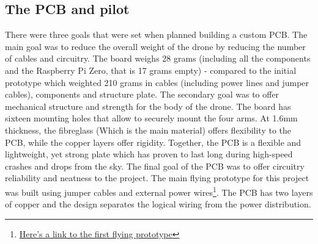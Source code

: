 \documentclass{IEEEtran}
\begin{document}
\subsection{\large{The PCB and pilot}}
\noindent There were three goals that were set when planned building a custom PCB. The main goal was to reduce the overall weight of the drone by reducing the number of cables and circuitry. The board weighs 28 grams (including all the components and the Raspberry Pi Zero, that is 17 grams empty) - compared to the initial prototype which weighted 210 grams in cables (including power lines and jumper cables), components and structure plate.
\newline
\newline
The secondary goal was to offer mechanical structure and strength for the body of the drone. The board has sixteen mounting holes that allow to securely mount the four arms. At 1.6mm thickness, the fibreglass (Which is the main material) offers flexibility to the PCB, while the copper layers offer rigidity. Together, the PCB is a flexible and lightweight, yet strong plate which has proven to last long during high-speed crashes and drops from the sky. 
\newline
\newline
The final goal of the PCB was to offer circuitry reliability and neatness to the project. The main flying prototype for this project was built using jumper cables and external power wires\footnote{\hyperlink{https://www.youtube.com/watch?v=LCkdW5JWxsk&feature=youtu.be}{Here's a link to the first flying prototype}}. The PCB has two layers of copper and the design separates the logical wiring from the power distribution.
\end{document}
